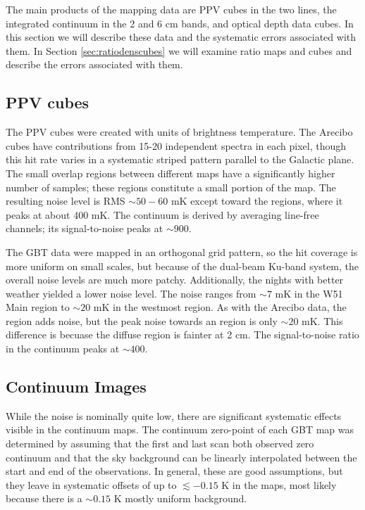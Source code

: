 The main products of the mapping data are PPV cubes in the two \formaldehyde
lines, the integrated continuum in the 2 and 6 cm bands, and optical depth data
cubes.  In this section we will describe these data and the systematic errors
associated with them.  In Section \ref{sec:ratiodenscubes} we will examine
ratio maps and cubes and describe the errors associated with them.

\subsection{PPV cubes}
The PPV cubes were created with units of brightness temperature.  The Arecibo
cubes have contributions from 15-20 independent spectra in each pixel, though
this hit rate varies in a systematic striped pattern parallel to the Galactic
plane.  The small overlap regions between different maps have a significantly
higher number of samples; these regions constitute a small portion of the map.
The resulting noise level is RMS $\sim 50-60$ mK except toward the \hii
regions, where it peaks at about 400 mK.  The continuum is derived by averaging
line-free channels; its signal-to-noise peaks at $\sim900$.

The GBT data were mapped in an orthogonal grid pattern, so the hit coverage is
more uniform on small scales, but because of the dual-beam Ku-band system, the
overall noise levels are much more patchy.  Additionally, the nights with
better weather yielded a lower noise level.  The noise ranges from $\sim7$ mK
in the W51 Main region to $\sim 20$ mK in the westmost region.  As with the
Arecibo data, the \hii region adds noise, but the peak noise towards an \hii
region is only $\sim 20$ mK.  This difference is becuase the diffuse \hii
region is fainter at 2 cm.  The signal-to-noise ratio in the continuum peaks at
$\sim 400$.

\subsection{Continuum Images}

While the noise is nominally quite low, there are significant systematic
effects visible in the continuum maps.  The continuum zero-point of each GBT
map was determined by assuming that the first and last scan both observed zero
continuum and that the sky background can be linearly interpolated between the
start and end of the observations.  In general, these are good assumptions, but
they leave in systematic offsets of up to $\lesssim-0.15$ K in the maps, most
likely because there is a $\sim0.15$ K mostly uniform background.

